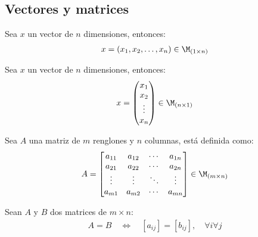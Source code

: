 \subsection{Vectores y matrices}

\begin{definition}
{
    \label{def:1.1.1}
    Sea $x$ un vector de $n$ dimensiones, entonces:
    \begin{align*}
        x = (x_1, x_2, \dots, x_n) \in \M_{(1 \times n)}
    \end{align*}
}
\end{definition}

\begin{definition}
{
    \label{def:1.1.2}
    Sea $x$ un vector de $n$ dimensiones, entonces:
    \begin{align*}
        x = \begin{pmatrix}
            x_1 \\
            x_2 \\
            \vdots \\
            x_n
        \end{pmatrix} \in \M_{(n \times 1)}
    \end{align*}
}
\end{definition}

\begin{definition}[Matriz]
{
    \label{def:1.1.3}
    Sea $A$ una matriz de $m$ renglones y $n$ columnas, está definida como:
    \begin{align*}
        A = \begin{bmatrix}
            a_{11} & a_{12} & \cdots & a_{1n} \\
            a_{21} & a_{22} & \cdots & a_{2n} \\
            \vdots & \vdots & \ddots  & \vdots \\
            a_{m1} & a_{m2} & \cdots & a_{mn}
        \end{bmatrix} \in \M_{(m \times n)}
    \end{align*}
}
\end{definition}

\begin{definition}[Igualdad]
{
    \label{def:1.1.4}
    Sean $A$ y $B$ dos matrices de $m \times n$:
    \begin{align*}
        A = B \quad \Longleftrightarrow \quad \left[a_{ij}\right] = \left[b_{ij}\right], \quad \forall i \forall j
    \end{align*}
}
\end{definition}

